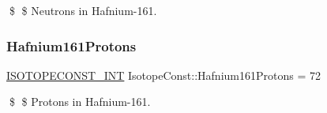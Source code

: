 \$ \$ Neutrons in Hafnium-\/161. \mbox{\label{group___isotope_const-_hafnium-_hf161_gadd6018108b5dd75799ea33e227b0dd87}} 
\subsubsection{\texorpdfstring{Hafnium161\+Protons}{Hafnium161Protons}}
{\footnotesize\ttfamily \mbox{\hyperlink{group___isotope_const-_macros_ga5f18360b3e99483a35c32d789e62621c}{I\+S\+O\+T\+O\+P\+E\+C\+O\+N\+S\+T\+\_\+\+I\+NT}} Isotope\+Const\+::\+Hafnium161\+Protons = 72}

\$ \$ Protons in Hafnium-\/161. 